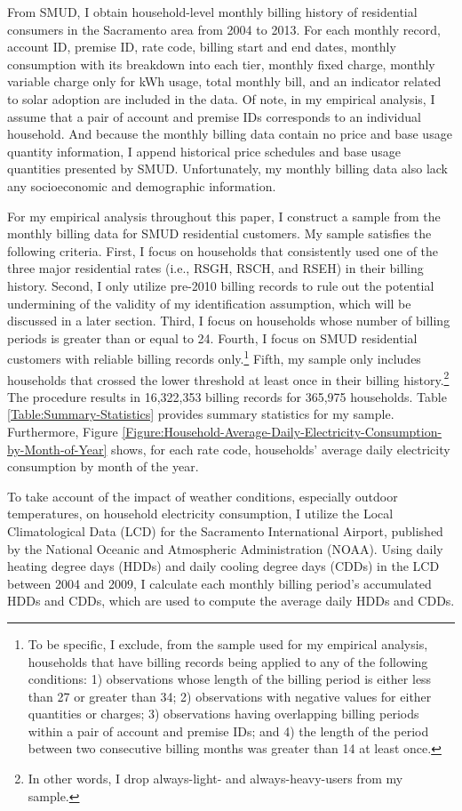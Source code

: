 From SMUD, I obtain household-level monthly billing history of residential consumers in the Sacramento area from 2004 to 2013. For each monthly record, account ID, premise ID, rate code, billing start and end dates, monthly consumption with its breakdown into each tier, monthly fixed charge, monthly variable charge only for kWh usage, total monthly bill, and an indicator related to solar adoption are included in the data. Of note, in my empirical analysis, I assume that a pair of account and premise IDs corresponds to an individual household. And because the monthly billing data contain no price and base usage quantity information, I append historical price schedules and base usage quantities presented by SMUD. Unfortunately, my monthly billing data also lack any socioeconomic and demographic information. 


For my empirical analysis throughout this paper, I construct a sample from the monthly billing data for SMUD residential customers. My sample satisfies the following criteria. First, I focus on households that consistently used one of the three major residential rates (i.e., RSGH, RSCH, and RSEH) in their billing history. Second, I only utilize pre-2010 billing records to rule out the potential undermining of the validity of my identification assumption, which will be discussed in a later section. Third, I focus on households whose number of billing periods is greater than or equal to 24. Fourth, I focus on SMUD residential customers with reliable billing records only.\footnote{To be specific, I exclude, from the sample used for my empirical analysis, households that have billing records being applied to any of the following conditions: 1) observations whose length of the billing period is either less than 27 or greater than 34; 2) observations with negative values for either quantities or charges; 3) observations having overlapping billing periods within a pair of account and premise IDs; and 4) the length of the period between two consecutive billing months was greater than 14 at least once.} Fifth, my sample only includes households that crossed the lower threshold at least once in their billing history.\footnote{In other words, I drop always-light- and always-heavy-users from my sample. } The procedure results in 16,322,353 billing records for 365,975 households. Table \ref{Table:Summary-Statistics} provides summary statistics for my sample. Furthermore, Figure \ref{Figure:Household-Average-Daily-Electricity-Consumption-by-Month-of-Year} shows, for each rate code, households' average daily electricity consumption by month of the year. 

To take account of the impact of weather conditions, especially outdoor temperatures, on household electricity consumption, I utilize the Local Climatological Data (LCD) for the Sacramento International Airport, published by the National Oceanic and Atmospheric Administration (NOAA). Using daily heating degree days (HDDs) and daily cooling degree days (CDDs) in the LCD between 2004 and 2009, I calculate each monthly billing period's accumulated HDDs and CDDs, which are used to compute the average daily HDDs and CDDs. 
